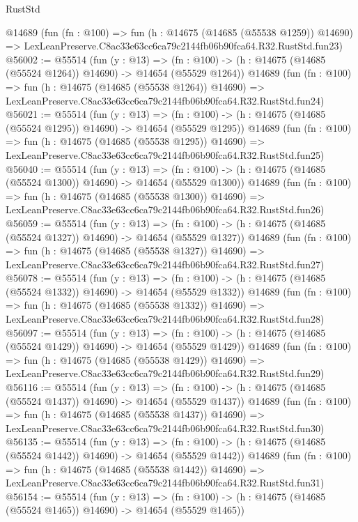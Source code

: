 \begin{lexlean}{RustStd}
\begin{coremodule}
    @14689
    (fun (fn : @100) =>
    fun (h : @14675 (@14685 (@55538 @1259)) @14690) =>
    LexLeanPreserve.C8ac33e63cc6ca79c2144fb06b90fca64.R32.RustStd.fun23)
@56002 := @55514
    (fun (y : @13) =>
    (fn : @100) -> (h : @14675 (@14685 (@55524 @1264)) @14690) -> @14654 (@55529 @1264))
    @14689
    (fun (fn : @100) =>
    fun (h : @14675 (@14685 (@55538 @1264)) @14690) =>
    LexLeanPreserve.C8ac33e63cc6ca79c2144fb06b90fca64.R32.RustStd.fun24)
@56021 := @55514
    (fun (y : @13) =>
    (fn : @100) -> (h : @14675 (@14685 (@55524 @1295)) @14690) -> @14654 (@55529 @1295))
    @14689
    (fun (fn : @100) =>
    fun (h : @14675 (@14685 (@55538 @1295)) @14690) =>
    LexLeanPreserve.C8ac33e63cc6ca79c2144fb06b90fca64.R32.RustStd.fun25)
@56040 := @55514
    (fun (y : @13) =>
    (fn : @100) -> (h : @14675 (@14685 (@55524 @1300)) @14690) -> @14654 (@55529 @1300))
    @14689
    (fun (fn : @100) =>
    fun (h : @14675 (@14685 (@55538 @1300)) @14690) =>
    LexLeanPreserve.C8ac33e63cc6ca79c2144fb06b90fca64.R32.RustStd.fun26)
@56059 := @55514
    (fun (y : @13) =>
    (fn : @100) -> (h : @14675 (@14685 (@55524 @1327)) @14690) -> @14654 (@55529 @1327))
    @14689
    (fun (fn : @100) =>
    fun (h : @14675 (@14685 (@55538 @1327)) @14690) =>
    LexLeanPreserve.C8ac33e63cc6ca79c2144fb06b90fca64.R32.RustStd.fun27)
@56078 := @55514
    (fun (y : @13) =>
    (fn : @100) -> (h : @14675 (@14685 (@55524 @1332)) @14690) -> @14654 (@55529 @1332))
    @14689
    (fun (fn : @100) =>
    fun (h : @14675 (@14685 (@55538 @1332)) @14690) =>
    LexLeanPreserve.C8ac33e63cc6ca79c2144fb06b90fca64.R32.RustStd.fun28)
@56097 := @55514
    (fun (y : @13) =>
    (fn : @100) -> (h : @14675 (@14685 (@55524 @1429)) @14690) -> @14654 (@55529 @1429))
    @14689
    (fun (fn : @100) =>
    fun (h : @14675 (@14685 (@55538 @1429)) @14690) =>
    LexLeanPreserve.C8ac33e63cc6ca79c2144fb06b90fca64.R32.RustStd.fun29)
@56116 := @55514
    (fun (y : @13) =>
    (fn : @100) -> (h : @14675 (@14685 (@55524 @1437)) @14690) -> @14654 (@55529 @1437))
    @14689
    (fun (fn : @100) =>
    fun (h : @14675 (@14685 (@55538 @1437)) @14690) =>
    LexLeanPreserve.C8ac33e63cc6ca79c2144fb06b90fca64.R32.RustStd.fun30)
@56135 := @55514
    (fun (y : @13) =>
    (fn : @100) -> (h : @14675 (@14685 (@55524 @1442)) @14690) -> @14654 (@55529 @1442))
    @14689
    (fun (fn : @100) =>
    fun (h : @14675 (@14685 (@55538 @1442)) @14690) =>
    LexLeanPreserve.C8ac33e63cc6ca79c2144fb06b90fca64.R32.RustStd.fun31)
@56154 := @55514
    (fun (y : @13) =>
    (fn : @100) -> (h : @14675 (@14685 (@55524 @1465)) @14690) -> @14654 (@55529 @1465))

\end{coremodule}
\end{lexlean}
